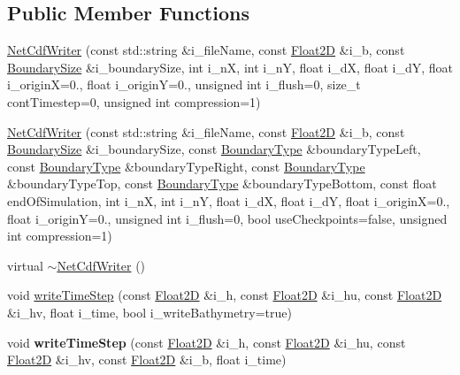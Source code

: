 \subsection*{Public Member Functions}
\begin{DoxyCompactItemize}
\item 
\hyperlink{classio_1_1NetCdfWriter_a1d69705f56dbab2b7f7e40edf4c681de}{Net\-Cdf\-Writer} (const std\-::string \&i\-\_\-file\-Name, const \hyperlink{classFloat2D}{Float2\-D} \&i\-\_\-b, const \hyperlink{structio_1_1BoundarySize}{Boundary\-Size} \&i\-\_\-boundary\-Size, int i\-\_\-n\-X, int i\-\_\-n\-Y, float i\-\_\-d\-X, float i\-\_\-d\-Y, float i\-\_\-origin\-X=0., float i\-\_\-origin\-Y=0., unsigned int i\-\_\-flush=0, size\-\_\-t cont\-Timestep=0, unsigned int compression=1)
\item 
\hyperlink{classio_1_1NetCdfWriter_a1cfba079bd92f3be84a4eb107ce30d8a}{Net\-Cdf\-Writer} (const std\-::string \&i\-\_\-file\-Name, const \hyperlink{classFloat2D}{Float2\-D} \&i\-\_\-b, const \hyperlink{structio_1_1BoundarySize}{Boundary\-Size} \&i\-\_\-boundary\-Size, const \hyperlink{SWE__Scenario_8hh_af75d5dd7322fa39ed0af4e7839e600f8}{Boundary\-Type} \&boundary\-Type\-Left, const \hyperlink{SWE__Scenario_8hh_af75d5dd7322fa39ed0af4e7839e600f8}{Boundary\-Type} \&boundary\-Type\-Right, const \hyperlink{SWE__Scenario_8hh_af75d5dd7322fa39ed0af4e7839e600f8}{Boundary\-Type} \&boundary\-Type\-Top, const \hyperlink{SWE__Scenario_8hh_af75d5dd7322fa39ed0af4e7839e600f8}{Boundary\-Type} \&boundary\-Type\-Bottom, const float end\-Of\-Simulation, int i\-\_\-n\-X, int i\-\_\-n\-Y, float i\-\_\-d\-X, float i\-\_\-d\-Y, float i\-\_\-origin\-X=0., float i\-\_\-origin\-Y=0., unsigned int i\-\_\-flush=0, bool use\-Checkpoints=false, unsigned int compression=1)
\item 
virtual \hyperlink{classio_1_1NetCdfWriter_ace10f1b56bbb4a1b6c2092ed661a1a0d}{$\sim$\-Net\-Cdf\-Writer} ()
\item 
void \hyperlink{classio_1_1NetCdfWriter_ada737dce75704e08520ce7ac922302be}{write\-Time\-Step} (const \hyperlink{classFloat2D}{Float2\-D} \&i\-\_\-h, const \hyperlink{classFloat2D}{Float2\-D} \&i\-\_\-hu, const \hyperlink{classFloat2D}{Float2\-D} \&i\-\_\-hv, float i\-\_\-time, bool i\-\_\-write\-Bathymetry=true)
\item 
\hypertarget{classio_1_1NetCdfWriter_a35a2e5df658e7e95afd3acea193b22a4}{void {\bfseries write\-Time\-Step} (const \hyperlink{classFloat2D}{Float2\-D} \&i\-\_\-h, const \hyperlink{classFloat2D}{Float2\-D} \&i\-\_\-hu, const \hyperlink{classFloat2D}{Float2\-D} \&i\-\_\-hv, const \hyperlink{classFloat2D}{Float2\-D} \&i\-\_\-b, float i\-\_\-time)}\label{classio_1_1NetCdfWriter_a35a2e5df658e7e95afd3acea193b22a4}

\end{DoxyCompactItemize}
